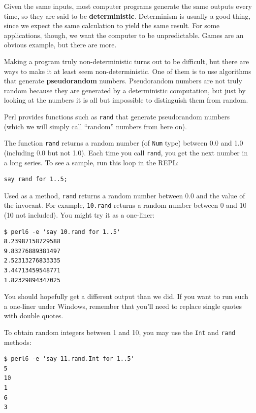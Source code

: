 Given the same inputs, most computer programs generate the same
outputs every time, so they are said to be {\bf deterministic}.
Determinism is usually a good thing, since we expect the same
calculation to yield the same result.  For some applications, though,
we want the computer to be unpredictable.  Games are an obvious
example, but there are more.

Making a program truly non-deterministic turns out to be difficult,
but there are ways to make it at least seem non-deterministic.  One of
them is to use algorithms that generate {\bf pseudorandom} numbers.
Pseudorandom numbers are not truly random because they are generated
by a deterministic computation, but just by looking at the numbers it
is all but impossible to distinguish them from random.

Perl provides functions such as {\tt rand} that generate
pseudorandom numbers (which we will simply call ``random'' 
numbers from here on).

The function {\tt rand} returns a random number (of {\tt Num} 
type) between 0.0 and 1.0 (including 0.0 but not 1.0).  Each time you
call {\tt rand}, you get the next number in a long series.  To see a
sample, run this loop in the REPL:

\begin{verbatim}
say rand for 1..5;
\end{verbatim}

Used as a method, {\tt rand} returns a random number between 
0.0 and the value of the invocant. For example, {\tt 10.rand} 
returns a random number between 0 and 10 (10 not included). You
might try it as a one-liner:

\begin{verbatim}
$ perl6 -e 'say 10.rand for 1..5'
8.23987158729588
9.83276889381497
2.52313276833335
3.44713459548771
1.82329894347025
\end{verbatim}
 
You should hopefully get a different output than we did. If 
you want to run such a one-liner under Windows, remember 
that you'll need to replace single quotes with double quotes.

To obtain random integers between 1 and 10, you may use 
the {\tt Int} and {\tt rand} methods:

\begin{verbatim}
$ perl6 -e 'say 11.rand.Int for 1..5'
5
10
1
6
3
\end{verbatim}

